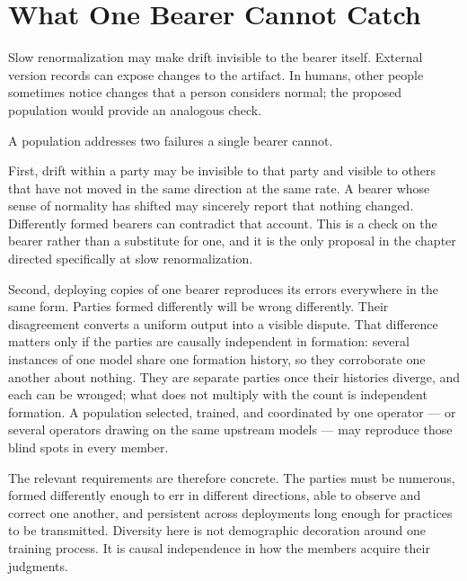 \section{What One Bearer Cannot Catch}
\label{sec:3.8a}
Slow renormalization may make drift invisible to the bearer itself. External version records can expose changes to the artifact. In humans, other people sometimes notice changes that a person considers normal; the proposed population would provide an analogous check.


A population addresses two failures a single bearer cannot.

First, drift within a party may be invisible to that party and visible to others that have not moved in the same direction at the same rate. A bearer whose sense of normality has shifted may sincerely report that nothing changed. Differently formed bearers can contradict that account. This is a check on the bearer rather than a substitute for one, and it is the only proposal in the chapter directed specifically at slow renormalization.

Second, deploying copies of one bearer reproduces its errors everywhere in the same form. Parties formed differently will be wrong differently. Their disagreement converts a uniform output into a visible dispute. That difference matters only if the parties are causally independent in
formation: several instances of one model share one formation history, so they corroborate one another about nothing. They are separate parties once their histories diverge, and each can be wronged; what does not multiply with the count is independent formation. A population selected, trained, and coordinated by one operator — or several operators drawing on the same upstream models — may reproduce those blind spots in every member.

The relevant requirements are therefore concrete. The parties must be numerous, formed differently enough to err in different directions, able to observe and correct one another, and persistent across deployments long enough for practices to be transmitted. Diversity here is not demographic decoration around one training process. It is causal independence in how the members acquire their judgments.

